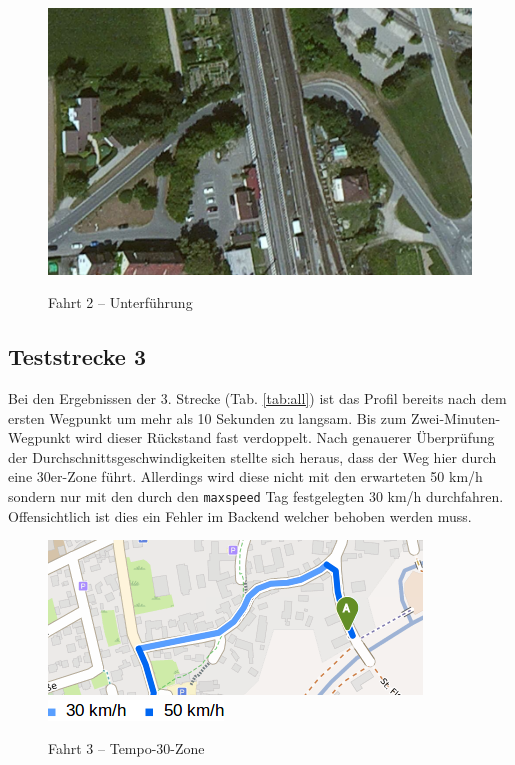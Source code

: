 \begin{figure}[htb]
\centering
\caption{Fahrt 2 -- Unterführung}
\label{fig:traintunnel}
\includegraphics[width = 0.70 \textwidth]{../media/traintunnel.png} \\
\end{figure}


\subsection{Teststrecke 3}

Bei den Ergebnissen der 3. Strecke (Tab. \ref{tab:all}) ist das Profil bereits nach dem ersten Wegpunkt um mehr als 10 Sekunden zu langsam.
Bis zum Zwei-Minuten-Wegpunkt wird dieser Rückstand fast verdoppelt.
Nach genauerer Überprüfung der Durchschnittsgeschwindigkeiten stellte sich heraus, dass der Weg hier durch eine 30er-Zone führt.
Allerdings wird diese nicht mit den erwarteten 50 km/h sondern nur mit den durch den \texttt{maxspeed} Tag festgelegten 30 km/h durchfahren.
Offensichtlich ist dies ein Fehler im Backend welcher behoben werden muss.

\begin{figure}[htb]
\centering
\caption{Fahrt 3 -- Tempo-30-Zone}
\label{fig:temp30}
\includegraphics[width = 0.60 \textwidth]{../media/Fahrt3_temp30.png} \\
\includegraphics[width = 0.20 \textwidth]{../media/legend3.png} \\
\end{figure}

